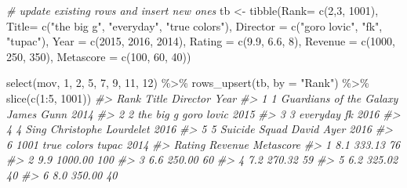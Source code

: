 \documentclass[
]{book}
\newenvironment{Shaded}{\begin{snugshade}}{\end{snugshade}}
\newcommand{\AttributeTok}[1]{\textcolor[rgb]{0.77,0.63,0.00}{#1}}
\newcommand{\CommentTok}[1]{\textcolor[rgb]{0.56,0.35,0.01}{\textit{#1}}}
\newcommand{\DecValTok}[1]{\textcolor[rgb]{0.00,0.00,0.81}{#1}}
\newcommand{\FloatTok}[1]{\textcolor[rgb]{0.00,0.00,0.81}{#1}}
\newcommand{\FunctionTok}[1]{\textcolor[rgb]{0.00,0.00,0.00}{#1}}
\newcommand{\NormalTok}[1]{#1}
\newcommand{\OtherTok}[1]{\textcolor[rgb]{0.56,0.35,0.01}{#1}}
\newcommand{\SpecialCharTok}[1]{\textcolor[rgb]{0.00,0.00,0.00}{#1}}
\newcommand{\StringTok}[1]{\textcolor[rgb]{0.31,0.60,0.02}{#1}}
\begin{document}
\begin{Shaded}
\begin{Highlighting}[]
\CommentTok{\# update existing rows and insert new ones}
\NormalTok{tb }\OtherTok{\textless{}{-}} 
  \FunctionTok{tibble}\NormalTok{(}\AttributeTok{Rank=} \FunctionTok{c}\NormalTok{(}\DecValTok{2}\NormalTok{,}\DecValTok{3}\NormalTok{, }\DecValTok{1001}\NormalTok{),}
         \AttributeTok{Title=} \FunctionTok{c}\NormalTok{(}\StringTok{"the big g"}\NormalTok{, }\StringTok{"everyday"}\NormalTok{, }\StringTok{"true colors"}\NormalTok{), }
         \AttributeTok{Director =} \FunctionTok{c}\NormalTok{(}\StringTok{"goro lovic"}\NormalTok{, }\StringTok{"fk"}\NormalTok{, }\StringTok{"tupac"}\NormalTok{), }
         \AttributeTok{Year =} \FunctionTok{c}\NormalTok{(}\DecValTok{2015}\NormalTok{, }\DecValTok{2016}\NormalTok{, }\DecValTok{2014}\NormalTok{), }
         \AttributeTok{Rating =} \FunctionTok{c}\NormalTok{(}\FloatTok{9.9}\NormalTok{, }\FloatTok{6.6}\NormalTok{, }\DecValTok{8}\NormalTok{), }
         \AttributeTok{Revenue =} \FunctionTok{c}\NormalTok{(}\DecValTok{1000}\NormalTok{, }\DecValTok{250}\NormalTok{, }\DecValTok{350}\NormalTok{), }
         \AttributeTok{Metascore =} \FunctionTok{c}\NormalTok{(}\DecValTok{100}\NormalTok{, }\DecValTok{60}\NormalTok{, }\DecValTok{40}\NormalTok{))}

\FunctionTok{select}\NormalTok{(mov, }\DecValTok{1}\NormalTok{, }\DecValTok{2}\NormalTok{, }\DecValTok{5}\NormalTok{, }\DecValTok{7}\NormalTok{, }\DecValTok{9}\NormalTok{, }\DecValTok{11}\NormalTok{, }\DecValTok{12}\NormalTok{) }\SpecialCharTok{\%\textgreater{}\%}
  \FunctionTok{rows\_upsert}\NormalTok{(tb, }\AttributeTok{by =} \StringTok{"Rank"}\NormalTok{) }\SpecialCharTok{\%\textgreater{}\%}
  \FunctionTok{slice}\NormalTok{(}\FunctionTok{c}\NormalTok{(}\DecValTok{1}\SpecialCharTok{:}\DecValTok{5}\NormalTok{, }\DecValTok{1001}\NormalTok{))}
\CommentTok{\#\textgreater{}   Rank                   Title             Director Year}
\CommentTok{\#\textgreater{} 1    1 Guardians of the Galaxy           James Gunn 2014}
\CommentTok{\#\textgreater{} 2    2               the big g           goro lovic 2015}
\CommentTok{\#\textgreater{} 3    3                everyday                   fk 2016}
\CommentTok{\#\textgreater{} 4    4                    Sing Christophe Lourdelet 2016}
\CommentTok{\#\textgreater{} 5    5           Suicide Squad           David Ayer 2016}
\CommentTok{\#\textgreater{} 6 1001             true colors                tupac 2014}
\CommentTok{\#\textgreater{}   Rating Revenue Metascore}
\CommentTok{\#\textgreater{} 1    8.1  333.13        76}
\CommentTok{\#\textgreater{} 2    9.9 1000.00       100}
\CommentTok{\#\textgreater{} 3    6.6  250.00        60}
\CommentTok{\#\textgreater{} 4    7.2  270.32        59}
\CommentTok{\#\textgreater{} 5    6.2  325.02        40}
\CommentTok{\#\textgreater{} 6    8.0  350.00        40}
\end{Highlighting}
\end{Shaded}
\end{document}
